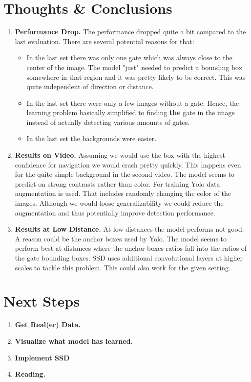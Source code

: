 \documentclass{article}
\begin{document}
\section{Thoughts \& Conclusions}
\begin{enumerate}
	\item \textbf{Performance Drop.} The performance dropped quite a bit compared to the last evaluation. There are several potential reasons for that:
	\begin{itemize}
		\item In the last set there was only one gate which was always close to the center of the image. The model "just" needed to predict a bounding box somewhere in that region and it was pretty likely to be correct. This was quite independent of direction or distance.
		\item In the last set there were only a few images without a gate. Hence, the learning problem basically simplified to finding \textbf{the} gate in the image instead of actually detecting various amounts of gates.
		\item In the last set the backgrounds were easier.
	\end{itemize} 
	
	\item \textbf{Results on Video.} Assuming we would use the box with the highest confidence for navigation we would crash pretty quickly. This happens even for the quite simple background in the second video. The model seems to predict on strong contrasts rather than color. For training Yolo data augmentation is used. That includes randomly changing the color of the images. Although we would loose generalizability we could reduce the augmentation and thus potentially improve detection performance.
	
	\item \textbf{Results at Low Distance.} At low distances the model performs not good. A reason could be the anchor boxes used by Yolo. The model seems to perform best at distances where the anchor boxes ratios fall into the ratios of the gate bounding boxes. SSD uses additional convolutional layers at higher scales to tackle this problem. This could also work for the given setting.  
\end{enumerate}
\section{Next Steps}
\begin{enumerate}
		\item \textbf{Get Real(er) Data.}
		\item \textbf{Visualize what model has learned.}
		\item \textbf{Implement SSD}
		\item \textbf{Reading.}
\end{enumerate}
\end{document}
